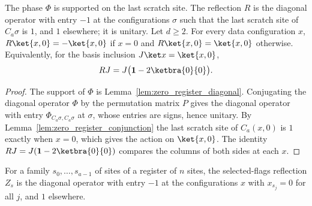 \begin{theorem}
    \label{thm:zero_register_reflection}
    \leanok
    The phase $\Phi$ is supported on the last scratch site. The reflection $R$ is the diagonal
    operator with entry $-1$ at the configurations $\sigma$ such that the last scratch site of
    $C_a\sigma$ is $1$, and $1$ elsewhere; it is unitary. Let $d\geq2$. For every data
    configuration $x$, $R\ket{x,0}=-\ket{x,0}$ if $x=0$ and $R\ket{x,0}=\ket{x,0}$ otherwise.
    Equivalently, for the basis inclusion $J\ket x=\ket{x,0}$,
    \begin{align}
        RJ=J\bigl(\mathbf 1-2\ketbra{0}{0}\bigr).
    \end{align}
\end{theorem}
\begin{proof}\leanok
    The support of $\Phi$ is Lemma~\ref{lem:zero_register_diagonal}. Conjugating the diagonal
    operator $\Phi$ by the permutation matrix $P$ gives the diagonal operator with entry
    $\Phi_{C_a\sigma,C_a\sigma}$ at $\sigma$, whose entries are signs, hence unitary. By
    Lemma~\ref{lem:zero_register_conjunction} the last scratch site of $C_a(x,0)$ is $1$
    exactly when $x=0$, which gives the action on $\ket{x,0}$. The identity
    $RJ=J(\mathbf 1-2\ketbra{0}{0})$ compares the columns of both sides at each $x$.
\end{proof}

\begin{definition}
    \label{def:zero_register_selected}
    \leanok
    For a family $s_0,\ldots,s_{a-1}$ of sites of a register of $n$ sites, the
    selected-flags reflection $Z_s$ is the diagonal operator with entry $-1$ at the
    configurations $x$ with $x_{s_j}=0$ for all $j$, and $1$ elsewhere.
\end{definition}

